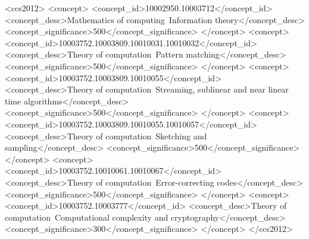 \documentclass[sigconf]{acmart}
\begin{document}
\begin{CCSXML}
	<ccs2012>
	<concept>
	<concept_id>10002950.10003712</concept_id>
	<concept_desc>Mathematics of computing~Information theory</concept_desc>
	<concept_significance>500</concept_significance>
	</concept>
	<concept>
	<concept_id>10003752.10003809.10010031.10010032</concept_id>
	<concept_desc>Theory of computation~Pattern matching</concept_desc>
	<concept_significance>500</concept_significance>
	</concept>
	<concept>
	<concept_id>10003752.10003809.10010055</concept_id>
	<concept_desc>Theory of computation~Streaming, sublinear and near linear time algorithms</concept_desc>
	<concept_significance>500</concept_significance>
	</concept>
	<concept>
	<concept_id>10003752.10003809.10010055.10010057</concept_id>
	<concept_desc>Theory of computation~Sketching and sampling</concept_desc>
	<concept_significance>500</concept_significance>
	</concept>
	<concept>
	<concept_id>10003752.10010061.10010067</concept_id>
	<concept_desc>Theory of computation~Error-correcting codes</concept_desc>
	<concept_significance>500</concept_significance>
	</concept>
	<concept>
	<concept_id>10003752.10003777</concept_id>
	<concept_desc>Theory of computation~Computational complexity and cryptography</concept_desc>
	<concept_significance>300</concept_significance>
	</concept>
	</ccs2012>
\end{CCSXML}


\maketitle








%



\end{document}
